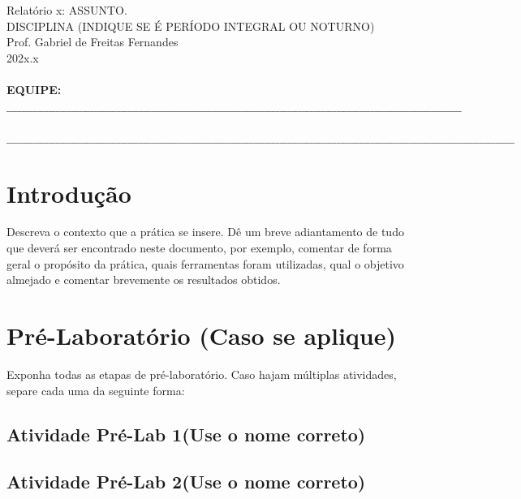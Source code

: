 \documentclass[a4paper,oneside,10pt]{article}
\begin{document}
\noindent Relatório x: ASSUNTO. \\
DISCIPLINA (INDIQUE SE É PERÍODO INTEGRAL OU NOTURNO)\\
Prof. Gabriel de Freitas Fernandes\\
202x.x\\
\\
\textbf{EQUIPE:} $\_ \_ \_ \_ \_ \_ \_ \_ \_ \_ \_ \_ \_ \_ \_ \_ \_ \_ \_ \_ \_ \_ \_ \_ \_ \_ \_ \_ \_ \_ \_ \_ \_ \_ \_ \_ \_ \_  \_ \_ \_ \_ \_ \_ \_ \_ \_ \_ \_ \_ \_  \_ \_ \_ \_  \_ \_ \_ \_  \_ \_ \_ \_  \_ \_ \_ \_  \_ \_  \_ \_ \_ \_  \_ \_  \_ \_ \_ \_  \_ \_  \_ \_ \_ \_  \_ \_  \_ \_ \_ \_  \_ \_  \_ \_ \_ \_  \_ \_  \_ \_ \_ \_  \_ \_  \_ \_ \_ \_  \_ \_  \_ \_ \_ \_  \_ \_  \_ \_ \_ $\\ \\
$\_  \_ \_  \_ \_ \_ \_  \_ \_  \_ \_ \_ \_  \_ \_  \_ \_ \_ \_  \_ \_  \_ \_ \_ \_  \_ \_  \_ \_ \_ \_  \_ \_  \_ \_ \_ \_  \_ \_  \_ \_ \_ \_  \_ \_  \_ \_ \_ \_  \_ \_  \_ \_ \_ \_  \_ \_  \_ \_ \_ \_  \_ \_  \_ \_ \_ \_  \_ \_  \_ \_ \_ \_  \_ \_  \_ \_ \_ \_  \_ \_  \_ \_ \_ \_  \_ \_  \_ \_ \_ \_  \_ \_  \_ \_ \_ \_  \_ \_  \_ \_ \_ \_  \_ \_  \_ \_ \_ \_  \_ \_  \_ \_ \_ \_  \_ \_  \_ \_ \_ \_  \_ \_  \_ \_ \_ \_  \_ \_  \_ \_ \_ \_  \_$
\\

\section{Introdução}
Descreva o contexto que a prática se insere. Dê um breve adiantamento de tudo que deverá ser encontrado neste documento, por exemplo, comentar de forma geral o propósito da prática, quais ferramentas foram utilizadas, qual o objetivo almejado e comentar brevemente os resultados obtidos.

\section{Pré-Laboratório (Caso se aplique)}

Exponha todas as etapas de pré-laboratório. Caso hajam múltiplas atividades, separe cada uma da seguinte forma:

\subsection{Atividade Pré-Lab 1(Use o nome correto)}

\subsection{Atividade Pré-Lab 2(Use o nome correto)}
\end{document}
